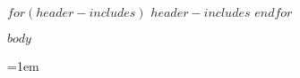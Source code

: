 %

$for(header-includes)$
$header-includes$
$endfor$





\begin{singlespace}
    
    
    

    \setcounter{page}{1}

    \tableofcontents

    \clearpage
    \printglossaries
    \clearpage

    \listoffigures
    \clearpage

    \listoftables
    \clearpage

    \listoflistings
    \clearpage


\end{singlespace}


    \clearpage

    $body$
    
    \clearpage

\begin{singlespace}

    \emergencystretch=1em
    \printbibliography[heading=bibintoc]
    \clearpage
\end{singlespace}

